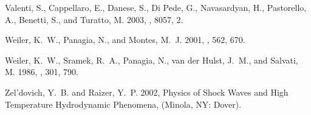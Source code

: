 \documentclass[12pt,preprint]{aastex}
\begin{document}
\begin{thebibliography}{}
{Valenti}, S., {Cappellaro}, E., {Danese}, S., {Di Pede}, G., {Navasardyan},
  H., {Pastorello}, A., {Benetti}, S., and {Turatto}, M. 2003, \iaucirc, 8057,
  2.

{Weiler}, K.~W., {Panagia}, N., and {Montes}, M.~J. 2001, \apj, 562, 670.

{Weiler}, K.~W., {Sramek}, R.~A., {Panagia}, N., {van der Hulst}, J.~M., and
  {Salvati}, M. 1986, \apj, 301, 790.

{Zel'dovich}, Y.~B. and {Raizer}, Y.~P. 2002, { {Physics of Shock Waves and High Temperature Hydrodynamic Phenomena}}, (Minola, NY: Dover).

\end{thebibliography}


\clearpage
\end{document}
